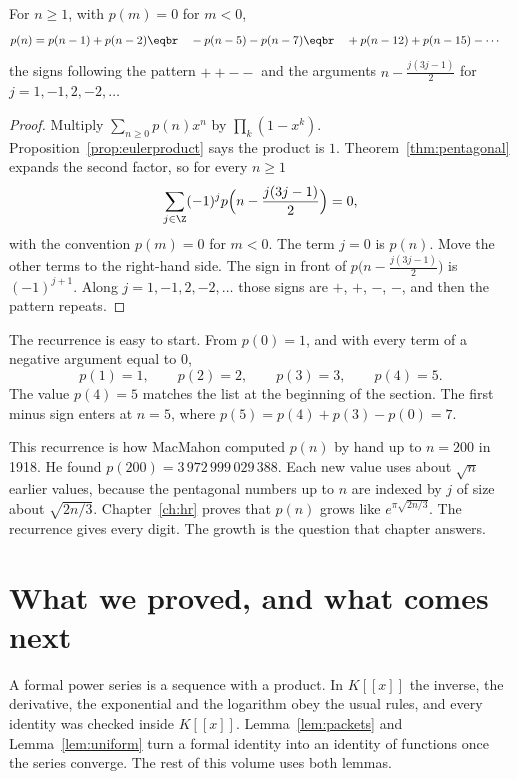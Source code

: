 \begin{corollary}\label{cor:partitionrec}
For $n\ge1$, with $p(m)=0$ for $m<0$,
\[
\begin{aligned}p(n)&=p(n-1)+p(n-2)\eqbr\quad-p(n-5)-p(n-7)\eqbr\quad+p(n-12)+p(n-15)-\cdots\end{aligned}
\]
the signs following the pattern $++--$ and the arguments $n-\frac{j(3j-1)}2$ for $j=1,-1,2,-2,\dots$
\end{corollary}
\begin{proof}
Multiply $\sum_{n\ge0}p(n)x^n$ by $\prod_k(1-x^k)$. Proposition~\ref{prop:eulerproduct} says the product is $1$. Theorem~\ref{thm:pentagonal} expands the second factor, so for every $n\ge1$
\[
\sum_{j\in\Z}(-1)^jp\Bigl(n-\frac{j(3j-1)}2\Bigr)=0,
\]
with the convention $p(m)=0$ for $m<0$. The term $j=0$ is $p(n)$. Move the other terms to the right-hand side. The sign in front of $p\bigl(n-\frac{j(3j-1)}2\bigr)$ is $(-1)^{j+1}$. Along $j=1,-1,2,-2,\dots$ those signs are $+$, $+$, $-$, $-$, and then the pattern repeats.
\end{proof}

The recurrence is easy to start. From $p(0)=1$, and with every term of a negative argument equal to $0$,
\[
p(1)=1,\qquad p(2)=2,\qquad p(3)=3,\qquad p(4)=5.
\]
The value $p(4)=5$ matches the list at the beginning of the section. The first minus sign enters at $n=5$, where $p(5)=p(4)+p(3)-p(0)=7$.

This recurrence is how MacMahon computed $p(n)$ by hand up to $n=200$ in 1918. He found $p(200)=3\,972\,999\,029\,388$. Each new value uses about $\sqrt n$ earlier values, because the pentagonal numbers up to $n$ are indexed by $j$ of size about $\sqrt{2n/3}$. Chapter~\ref{ch:hr} proves that $p(n)$ grows like $e^{\pi\sqrt{2n/3}}$. The recurrence gives every digit. The growth is the question that chapter answers.

\section{What we proved, and what comes next}

A formal power series is a sequence with a product. In $K[[x]]$ the inverse, the derivative, the exponential and the logarithm obey the usual rules, and every identity was checked inside $K[[x]]$. Lemma~\ref{lem:packets} and Lemma~\ref{lem:uniform} turn a formal identity into an identity of functions once the series converge. The rest of this volume uses both lemmas.

